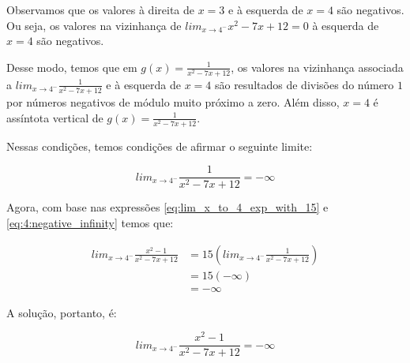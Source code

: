\documentclass{article}
\begin{document}

Observamos que os valores à direita de \(x = 3\) e à esquerda de \(x = 4\) são negativos.
Ou seja, os valores na vizinhança de \(lim_{x\to 4^-} x^2-7x+12 = 0\) à esquerda de \(x = 4\) são negativos.

Desse modo, temos que em \(g(x) = \frac{1}{x^2-7x+12}\), os valores na vizinhança associada a \(lim_{x\to 4^-} \frac{1}{x^2-7x+12}\)
e à esquerda de \(x = 4\) são resultados de divisões do número \(1\) por números negativos de módulo muito próximo a zero. Além disso, \(x = 4\) é
assíntota vertical de \(g(x) = \frac{1}{x^2-7x+12}\).

Nessas condições, temos condições de afirmar o seguinte limite:

\begin{equation} \label{eq:4:negative_infinity}
    lim_{x\to 4^-} \frac{1}{x^2-7x+12} = -\infty
\end{equation}

Agora, com base nas expressões \ref{eq:lim_x_to_4_exp_with_15} e \ref{eq:4:negative_infinity} temos que:


\begin{align*}
    lim_{x\to 4^-} \frac{x^2-1}{x^2-7x+12}
     & = 15\left(lim_{x\to 4^-} \frac{1}{x^2-7x+12}\right) \\
     & = 15(-\infty)                                       \\
     & = -\infty
\end{align*}

A solução, portanto, é:

\begin{equation*}
    lim_{x\to 4^-} \frac{x^2-1}{x^2-7x+12} = -\infty
\end{equation*}
\end{document}

